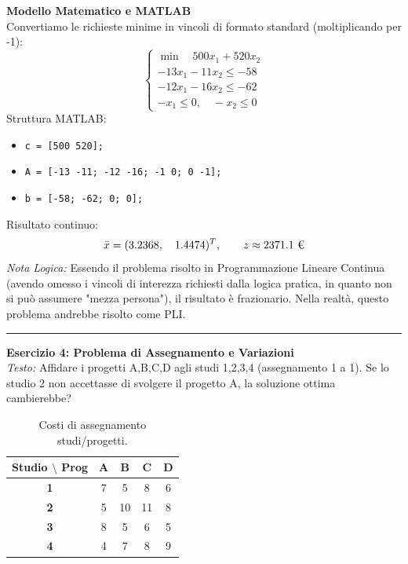 \documentclass[12pt, a4paper]{article}
\renewcommand{\arraystretch}{1.25}
\begin{document}
	\textbf{Modello Matematico e MATLAB}\\
	Convertiamo le richieste minime in vincoli di formato standard (moltiplicando per -1):
	\[
	\begin{cases}
		\min \quad 500x_1 + 520x_2 \\[6pt]
		-13x_1 - 11x_2 \leq -58 \\
		-12x_1 - 16x_2 \leq -62 \\
		-x_1 \leq 0, \quad -x_2 \leq 0
	\end{cases}
	\]
	Struttura MATLAB:
	\begin{itemize}[label=$\circ$, itemsep=2pt, leftmargin=1.5cm]
		\item \texttt{c = [500 520];}
		\item \texttt{A = [-13 -11; -12 -16; -1 0; 0 -1];}
		\item \texttt{b = [-58; -62; 0; 0];}
	\end{itemize}
	Risultato continuo:
	\[
	\bar{x} = (3.2368, \quad 1.4474)^T, \qquad z \approx 2371.1 \text{ \texteuro}
	\]
	\textit{Nota Logica:} Essendo il problema risolto in Programmazione Lineare Continua (avendo omesso i vincoli di interezza richiesti dalla logica pratica, in quanto non si può assumere "mezza persona"), il risultato è frazionario. Nella realtà, questo problema andrebbe risolto come PLI.
	
	\vspace{0.6cm}
	\hrule
	\vspace{0.4cm}
	
	\textbf{Esercizio 4: Problema di Assegnamento e Variazioni}\\
	\textit{Testo:} Affidare i progetti A,B,C,D agli studi 1,2,3,4 (assegnamento 1 a 1). 
	Se lo studio 2 non accettasse di svolgere il progetto A, la soluzione ottima cambierebbe?
	
	\begin{table}[H]
		\centering
		\renewcommand{\arraystretch}{1.3}
		\begin{tabular}{|c|c|c|c|c|}
			\hline
			\textbf{Studio $\setminus$ Prog} & \textbf{A} & \textbf{B} & \textbf{C} & \textbf{D} \\ \hline
			\textbf{1} & 7 & 5 & 8 & 6 \\ \hline
			\textbf{2} & 5 & 10 & 11 & 8 \\ \hline
			\textbf{3} & 8 & 5 & 6 & 5 \\ \hline
			\textbf{4} & 4 & 7 & 8 & 9 \\ \hline
		\end{tabular}
		\caption{Costi di assegnamento studi/progetti.}
	\end{table}
	
\end{document}
